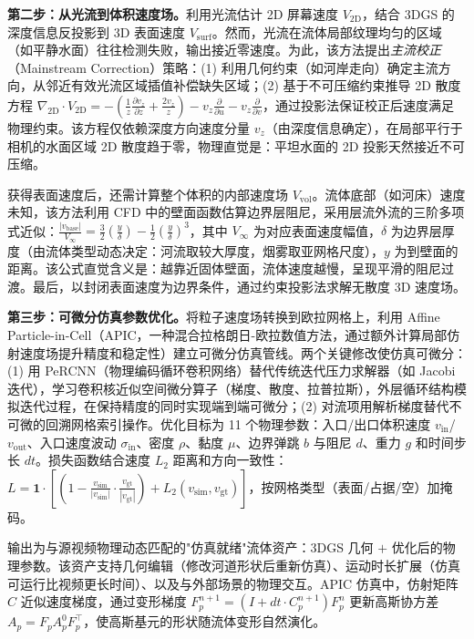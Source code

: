 \textbf{第二步：从光流到体积速度场。}利用光流估计 2D 屏幕速度 $V_\text{2D}$，结合 3DGS 的深度信息反投影到 3D 表面速度 $V_\text{surf}$。然而，光流在流体局部纹理均匀的区域（如平静水面）往往检测失败，输出接近零速度。为此，该方法提出\emph{主流校正}（Mainstream Correction）策略：(1) 利用几何约束（如河岸走向）确定主流方向，从邻近有效光流区域插值补偿缺失区域；(2) 基于不可压缩约束推导 2D 散度方程 $\nabla_\text{2D} \cdot V_\text{2D} = -(\frac{1}{z}\frac{\partial v_z}{\partial z} + \frac{2v_z}{z}) - v_z \frac{\partial}{\partial u} - v_z \frac{\partial}{\partial v}$，通过投影法保证校正后速度满足物理约束。该方程仅依赖深度方向速度分量 $v_z$（由深度信息确定），在局部平行于相机的水面区域 2D 散度趋于零，物理直觉是：平坦水面的 2D 投影天然接近不可压缩。

获得表面速度后，还需计算整个体积的内部速度场 $V_\text{vol}$。流体底部（如河床）速度未知，该方法利用 CFD 中的壁面函数估算边界层阻尼，采用层流外流的三阶多项式近似：$\frac{|v_\text{base}|}{V_\infty} = \frac{3}{2}\left(\frac{y}{\delta}\right) - \frac{1}{2}\left(\frac{y}{\delta}\right)^3$，其中 $V_\infty$ 为对应表面速度幅值，$\delta$ 为边界层厚度（由流体类型动态决定：河流取较大厚度，烟雾取亚网格尺度），$y$ 为到壁面的距离。该公式直觉含义是：越靠近固体壁面，流体速度越慢，呈现平滑的阻尼过渡。最后，以封闭表面速度为边界条件，通过约束投影法求解无散度 3D 速度场。

\textbf{第三步：可微分仿真参数优化。}将粒子速度场转换到欧拉网格上，利用 Affine Particle-in-Cell（APIC，一种混合拉格朗日-欧拉数值方法，通过额外计算局部仿射速度场提升精度和稳定性）建立可微分仿真管线。两个关键修改使仿真可微分：(1) 用 PeRCNN（物理编码循环卷积网络）替代传统迭代压力求解器（如 Jacobi 迭代），学习卷积核近似空间微分算子（梯度、散度、拉普拉斯），外层循环结构模拟迭代过程，在保持精度的同时实现端到端可微分；(2) 对流项用解析梯度替代不可微的回溯网格索引操作。优化目标为 11 个物理参数：入口/出口体积速度 $v_\text{in}$/$v_\text{out}$、入口速度波动 $\sigma_\text{in}$、密度 $\rho$、黏度 $\mu$、边界弹跳 $b$ 与阻尼 $d$、重力 $g$ 和时间步长 $dt$。损失函数结合速度 $L_2$ 距离和方向一致性：$L = \mathbf{1} \cdot \left[(1 - \frac{v_\text{sim}}{|v_\text{sim}|} \cdot \frac{v_\text{gt}}{|v_\text{gt}|}) + L_2(v_\text{sim}, v_\text{gt})\right]$，按网格类型（表面/占据/空）加掩码。

输出为与源视频物理动态匹配的"仿真就绪"流体资产：3DGS 几何 $+$ 优化后的物理参数。该资产支持几何编辑（修改河道形状后重新仿真）、运动时长扩展（仿真可运行比视频更长时间）、以及与外部场景的物理交互。APIC 仿真中，仿射矩阵 $C$ 近似速度梯度，通过变形梯度 $F_p^{n+1} = (I + dt \cdot C_p^{n+1}) F_p^n$ 更新高斯协方差 $A_p = F_p A_p^0 F_p^\top$，使高斯基元的形状随流体变形自然演化。

